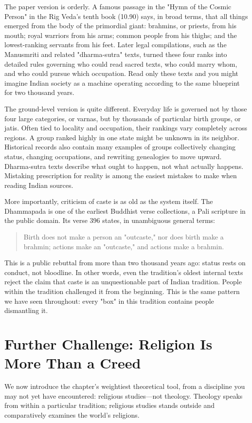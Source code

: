 The paper version is orderly. A famous passage in the "Hymn of the Cosmic Person" in the Rig Veda's tenth book (10.90) says, in broad terms, that all things emerged from the body of the primordial giant: brahmins, or priests, from his mouth; royal warriors from his arms; common people from his thighs; and the lowest-ranking servants from his feet. Later legal compilations, such as the Manusmriti and related "dharma-sutra" texts, turned these four ranks into detailed rules governing who could read sacred texts, who could marry whom, and who could pursue which occupation. Read only these texts and you might imagine Indian society as a machine operating according to the same blueprint for two thousand years.

The ground-level version is quite different. Everyday life is governed not by those four large categories, or varnas, but by thousands of particular birth groups, or jatis. Often tied to locality and occupation, their rankings vary completely across regions. A group ranked highly in one state might be unknown in its neighbor. Historical records also contain many examples of groups collectively changing status, changing occupations, and rewriting genealogies to move upward. Dharma-sutra texts describe what ought to happen, not what actually happens. Mistaking prescription for reality is among the easiest mistakes to make when reading Indian sources.

More importantly, criticism of caste is as old as the system itself. The Dhammapada is one of the earliest Buddhist verse collections, a Pali scripture in the public domain. Its verse 396 states, in unambiguous general terms:

\begin{quote}
Birth does not make a person an "outcaste," nor does birth make a brahmin; actions make an "outcaste," and actions make a brahmin.
\end{quote}
This is a public rebuttal from more than two thousand years ago: status rests on conduct, not bloodline. In other words, even the tradition's oldest internal texts reject the claim that caste is an unquestionable part of Indian tradition. People within the tradition challenged it from the beginning. This is the same pattern we have seen throughout: every "box" in this tradition contains people dismantling it.

\section[Religion Beyond a Creed]{Further Challenge: Religion Is More Than a Creed}
We now introduce the chapter's weightiest theoretical tool, from a discipline you may not yet have encountered: religious studies---not theology. Theology speaks from within a particular tradition; religious studies stands outside and comparatively examines the world's religions.

